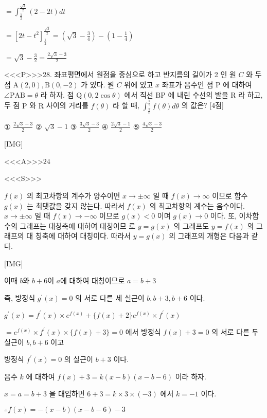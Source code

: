 \documentclass{oblivoir}
\begin{document}
$=\int_{\frac{1}{2}}^{\frac{\sqrt{3}}{2}}(2-2 t) d t$

$=\left[2 t-t^{2}\right]_{\frac{1}{2}}^{\frac{\sqrt{3}}{2}}=\left(\sqrt{3}-\frac{3}{4}\right)-\left(1-\frac{1}{4}\right)$

$=\sqrt{3}-\frac{3}{2}=\frac{2 \sqrt{3}-3}{2}$


<<<P>>>28. 좌표평면에서 원점을 중심으로 하고 반지름의 길이가 2 인 원 $C$ 와 두 점 $\mathrm{A}(2,0), \mathrm{B}(0,-2)$ 가 있다. 원 $C$ 위에 있고 $x$ 좌표가 음수인 점 $\mathrm{P}$ 에 대하여 $\angle \mathrm{PAB}=\theta$ 라 하자.
점 $\mathrm{Q}(0,2 \cos \theta)$ 에서 직선 $\mathrm{BP}$ 에 내린 수선의 발을 $\mathrm{R}$ 라 하고, 두 점 $\mathrm{P}$ 와 $\mathrm{R}$ 사이의 거리를 $f(\theta)$ 라 할 때, $\int_{\frac{\pi}{6}}^{\frac{\pi}{3}} f(\theta) d \theta$ 의 값은? [4점]

① $\frac{2 \sqrt{3}-3}{2}$
② $\sqrt{3}-1$
③ $\frac{3 \sqrt{3}-3}{2}$
④ $\frac{2 \sqrt{3}-1}{2}$
⑤ $\frac{4 \sqrt{3}-3}{2}$


[IMG]


<<<A>>>$24$

<<<S>>>



$f(x)$ 의 최고차항의 계수가 양수이면 $x \rightarrow \pm \infty$ 일 때 $f(x) \rightarrow \infty$ 이므로 함수 $g(x)$ 는 최댓값을 갖지 않는다.
따라서 $f(x)$ 의 최고차항의 계수는 음수이다. $x \rightarrow \pm \infty$ 일 때 $f(x) \rightarrow-\infty$ 이므로 $g(x)<0$ 이며 $g(x) \rightarrow 0$ 이다.
또, 이차함수의 그래프는 대칭축에 대하여 대칭이므 로 $y=g(x)$ 의 그래프도 $y=f(x)$ 의 그래프의 대 칭축에 대하여 대칭이다.
따라서 $y=g(x)$ 의 그래프의 개형은 다음과 같다.

[IMG]

이때 $b$와 $b+6$이 $a$에 대하여 대칭이므로 $a=b+3$ 

즉, 방정식 $g^{\prime}(x)=0$ 의 서로 다른 세 실근이 $b, b+3, b+6$ 이다.

$g^{\prime}(x)=f^{\prime}(x) \times e^{f(x)}+\{f(x)+2\} e^{f(x)} \times f^{\prime}(x)$

$=e^{f(x)} \times f^{\prime}(x) \times\{f(x)+3\}=0$ 에서 방정식 $f(x)+3=0$ 의 서로 다른 두 실근이 $b, b+6$ 이고

방정식 $f^{\prime}(x)=0$ 의 실근이 $b+3$ 이다.

음수 $k$ 에 대하여 $f(x)+3=k(x-b)(x-b-6)$ 이라 하자.

$x=a=b+3$ 을 대입하면 $6+3=k \times 3 \times(-3)$ 에서 $k=-1$ 이다.

$\therefore f(x)=-(x-b)(x-b-6)-3$
\end{document}
